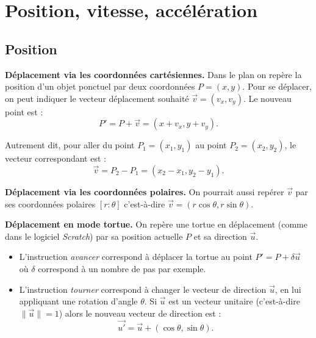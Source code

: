 \documentclass[11pt,class=report,crop=false]{standalone}
\begin{document}

%
%
%



\section{Position, vitesse, accélération}

\subsection{Position}

\textbf{Déplacement via les coordonnées cartésiennes.}
Dans le plan on repère la position d'un objet ponctuel par deux coordonnées $P = (x,y)$.
Pour se déplacer, on peut indiquer le vecteur déplacement souhaité $\vec v = (v_x,v_y)$.
Le nouveau point est :
$$P' = P + \vec{v} = (x+v_x, y + v_y).$$

	
Autrement dit, pour aller du point $P_1 = (x_1,y_1)$ au point $P_2 = (x_2,y_2)$, le vecteur correspondant est :
$$\vec v  = P_2 - P_1 = (x_2-x_1, y_2-y_1).$$


\textbf{Déplacement via les coordonnées polaires.} 
On pourrait aussi repérer $\vec v$ par ses coordonnées polaires $[r:\theta]$ c'est-à-dire
$\vec v  = (r\cos \theta, r\sin\theta)$.


\textbf{Déplacement en mode \og{}tortue\fg{}.} 
On repère une tortue en déplacement (comme dans le logiciel \emph{Scratch}) par sa position actuelle $P$ et sa direction $\vec u$.
\begin{itemize}
	\item L'instruction \emph{avancer} correspond à déplacer la tortue au point $P' = P  + \delta \vec u$ où $\delta$ correspond à un nombre de pas par exemple.

    \item L'instruction \emph{tourner} correspond à changer le vecteur de direction $\vec u$, en lui appliquant une rotation d'angle $\theta$.
    Si $\vec u$ est un vecteur unitaire (c'est-à-dire $\| \vec u \| = 1$) alors le nouveau vecteur de direction est :    
    $$\vec{u'} = \vec{u} + (\cos \theta, \sin\theta).$$
\end{itemize}
\end{document}
